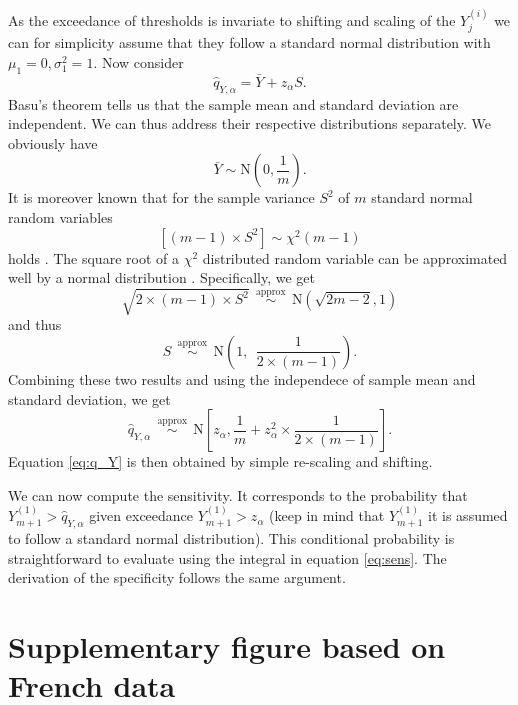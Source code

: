 \documentclass{article}
\begin{document}
As the exceedance of thresholds is invariate to shifting and scaling of the $Y^{(i)}_j$ we can for simplicity assume that they follow a standard normal distribution with $\mu_1 = 0, \sigma^2_1 = 1$. Now consider
$$
\hat{q}_{Y, \alpha} = \bar{Y} + z_\alpha S.
$$
Basu's theorem tells us that the sample mean and standard deviation are independent. We can thus  address their respective distributions separately. We obviously have
$$
\bar{Y} \sim \text{N}\left(0, \frac{1}{m}\right).
$$
It is moreover known that for the sample variance $S^2$ of $m$ standard normal random variables
$$
[(m - 1) \times S^2] \sim \chi^2(m - 1)
$$
holds \citep{HELM2008}. The square root of a $\chi^2$ distributed random variable can be approximated well by a normal distribution \citep[p426]{Johnson1994}. Specifically, we get
$$
\sqrt{2 \times (m - 1) \times S^2} \ \  \stackrel{\text{approx}}{\sim} \ \ \text{N}(\sqrt{2m - 2}, 1)
$$
and thus
$$
S \ \  \stackrel{\text{approx}}{\sim} \ \ \text{N}\left(1, \ \ \frac{1}{2\times(m - 1)}\right).
$$
Combining these two results and using the independece of sample mean and standard deviation, we get
$$
\hat{q}_{Y, \alpha} \ \  \stackrel{\text{approx}}{\sim} \ \ \text{N}\left[z_\alpha, \frac{1}{m} + z_\alpha^2 \times \frac{1}{2 \times (m - 1)} \right].
$$
Equation \eqref{eq:q_Y} is then obtained by simple re-scaling and shifting.

We can now compute the sensitivity. It corresponds to the probability that $Y^{(1)}_{m + 1} > \hat{q}_{Y, \alpha}$ given exceedance $Y^{(1)}_{m + 1} > z_\alpha$ (keep in mind that $Y^{(1)}_{m + 1}$ it is assumed to follow a standard normal distribution). This conditional probability is straightforward to evaluate using the integral in equation \eqref{eq:sens}. The derivation of the specificity follows the same argument.

\newpage

\section{Supplementary figure based on French data}
\end{document}
